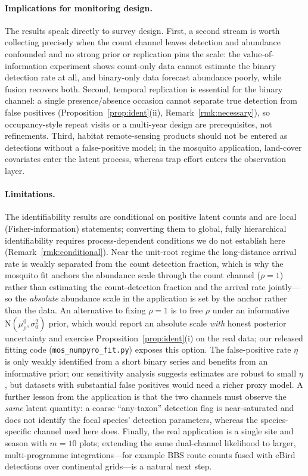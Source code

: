 \documentclass[preprint,12pt]{elsarticle}
\theoremstyle{definition}
\begin{document}
\paragraph{Implications for monitoring design.}
The results speak directly to survey design. First, a second stream is
worth collecting precisely when the count channel leaves detection and
abundance confounded and no strong prior or replication pins the scale: the
value-of-information experiment shows count-only data cannot estimate the
binary detection rate at all, and binary-only data forecast abundance
poorly, while fusion recovers both. Second, temporal replication is
essential for the binary channel: a single presence/absence occasion cannot
separate true detection from false positives
(Proposition~\ref{prop:ident}(ii), Remark~\ref{rmk:necessary}), so
occupancy-style repeat visits or a multi-year design are prerequisites, not
refinements. Third, habitat remote-sensing products should not be entered as
detections without a false-positive model; in the mosquito application,
land-cover covariates enter the latent process, whereas trap effort enters the
observation layer.

\paragraph{Limitations.}
The identifiability results are conditional on positive latent counts and
are local (Fisher-information) statements; converting them to global,
fully hierarchical identifiability requires process-dependent conditions we
do not establish here (Remark~\ref{rmk:conditional}). Near the unit-root
regime the long-distance arrival rate is weakly separated from the count
detection fraction, which is why the mosquito fit anchors the abundance scale
through the count channel ($\rho{=}1$) rather than estimating the
count-detection fraction and the arrival rate jointly---so the \emph{absolute}
abundance scale in the application is set by the anchor rather than the data. An
alternative to fixing $\rho=1$ is to free $\rho$ under an informative
$\mathrm{N}(\mu_\rho^0,\sigma_0^2)$ prior, which would report an absolute scale
\emph{with} honest posterior uncertainty and exercise
Proposition~\ref{prop:ident}(i) on the real data; our released fitting code
(\texttt{mos\_numpyro\_fit.py}) exposes this option. The
false-positive rate $\eta$ is only weakly identified from a short binary series
and benefits from an informative prior; our sensitivity analysis suggests
estimates are robust to small $\eta$, but datasets with substantial false
positives would need a richer proxy model. A further lesson from the application
is that the two channels must observe the \emph{same} latent quantity: a coarse
``any-taxon'' detection flag is near-saturated and does not identify the focal
species' detection parameters, whereas the species-specific channel used here
does. Finally, the real application is a single site and season with $m=10$
plots; extending the same dual-channel likelihood to larger, multi-programme
integrations---for example BBS route counts fused with eBird detections over
continental grids---is a natural next step.
\end{document}
